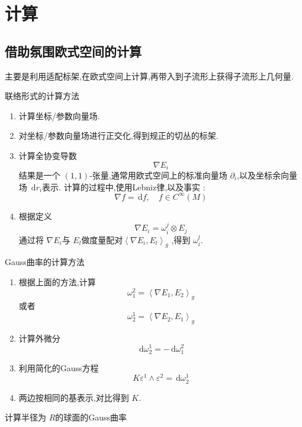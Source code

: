 \documentclass[../../main.tex]{subfiles}
\begin{document}
\section{计算}

\subsection{借助氛围欧式空间的计算}
主要是利用适配标架,在欧式空间上计算,再带入到子流形上获得子流形上几何量.
\begin{method}{联络形式的计算方法}
    \begin{enumerate}
        \item 计算坐标/参数向量场.
        \item 对坐标/参数向量场进行正交化,得到规正的切丛的标架.
        \item 计算全协变导数 \[
         \nabla E_{i}
        \]结果是一个 \(  \left( 1,1 \right)   \)-张量,通常用欧式空间上的标准向量场 \(   \partial _{i}  \),以及坐标余向量场 \(  \,\mathrm{d} r_{i}  \)表示.   计算的过程中,使用Lebniz律,以及事实 :\[
     \nabla f= \,\mathrm{d} f,\quad f\in C^{\infty}\left( M \right) 
    \]
    \item 根据定义 \[
     \nabla E_{i}=  \omega _{i}^{j}\otimes E_{j}
    \]通过将 \(   \nabla E_{i}  \)与 \(  E_{l}  \)做度量配对\(  \left< \nabla E_{i},E_{l} \right>_{g}  \) ,得到 \(   \omega _{i}^{l}  \).   
    \end{enumerate}
    
\end{method}

\begin{method}{Gauss曲率的计算方法}
    \begin{enumerate}
        \item 根据上面的方法,计算 \[
     \omega _{1}^{2}= \left< \nabla E_{1},E_2 \right>_{g}
    \]或者 \[
      \omega _{2}^{1}= \left< \nabla E_2,E_1 \right>_{g}
    \]
    \item 计算外微分 \[
    \,\mathrm{d}  \omega _{2}^{1}= -\,\mathrm{d}  \omega _{1}^{2}
    \]
    \item 利用简化的Gauss方程 \[
    K \varepsilon ^{1}\wedge  \varepsilon ^{2}= \,\mathrm{d}  \omega _{2}^{1}
    \]
    \item 两边按相同的基表示,对比得到 \(  K  \).
    \end{enumerate}
    
\end{method}
\begin{example}[ 球面]
    计算半径为 \(  R  \)的球面的Gauss曲率    
\end{example}
\end{document}

